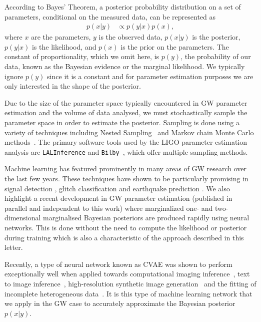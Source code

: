 \documentclass[%
showpacs,
 amsmath,amssymb,
 aps,
 twocolumn,
 prl,
 reprint,
floatfix,
]{revtex4-1}
\begin{document}
%
%
According to Bayes' Theorem, a posterior probability distribution on a set of
parameters, conditional on the measured data, can be represented as
%
\begin{align}\label{eq:bayes_theorem} 
p(x|y) &\propto p(y|x) p(x), 
\end{align}
%
where $x$ are the parameters, $y$ is the observed data, $p(x|y)$ is the
posterior, $p(y|x)$ is the likelihood, and $p(x)$ is the prior on the
parameters. The constant of proportionality, which we omit here, is
$p(y)$, the probability of our data, known as the Bayesian evidence or the
marginal likelihood. We typically ignore $p(y)$ since it is a constant and for
parameter estimation purposes we are only interested in the shape of the
posterior.

%
%
Due to the size of the parameter space typically encountered in \ac{GW}
parameter estimation and the volume of data analysed, we must stochastically
sample the parameter space in order to estimate the posterior.  Sampling is
done using a variety of techniques including Nested
Sampling~\cite{skilling2006,cpnest,dynesty} and Markov chain Monte Carlo
methods~\cite{emcee,ptemcee}. The primary software tools used by the \ac{LIGO}
parameter estimation analysis are \texttt{LALInference} and
\texttt{Bilby}~\cite{1409.7215,1811.02042}, which offer multiple sampling
methods.  
  
%
%
Machine learning has featured prominently in many areas of \ac{GW} research
over the last few years. These techniques have shown to be particularly
promising in signal detection
\cite{GEORGE201864,PhysRevLett.120.141103,1904.08693}, glitch classification
\cite{1706.07446,0264-9381-34-6-064003} and earthquake prediction
\cite{Coughlin_2017}. We also highlight a recent development in \ac{GW}
parameter estimation (published in parallel and independent to this work) where
marginalized one- and two-dimensional marginalised Bayesian posteriors are
produced rapidly using neural networks. This is done without the need to
compute the likelihood or posterior during training which is also a
characteristic of the approach described in this letter.

%
%
Recently, a type of neural network known as \ac{CVAE} was
shown to perform exceptionally well when applied towards computational imaging
inference~\cite{1904.06264,NIPS2015_5775}, text to image
inference~\cite{1512.00570}, high-resolution synthetic image
generation~\cite{1612.00005} and the fitting of incomplete heterogeneous
data~\cite{1807.03653}. It is this type of machine learning network that we
apply in the \ac{GW} case to accurately approximate the Bayesian posterior
$p(x|y)$. 
\end{document}
